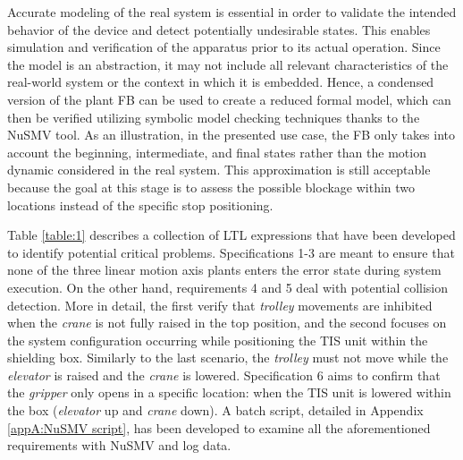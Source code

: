 \begin{bibunit}
Accurate modeling of the real system is essential in order to validate the  intended behavior of the device and detect potentially undesirable states. This enables simulation and verification of the apparatus prior to its actual operation. Since the model is an abstraction, it may not include all relevant characteristics of the real-world system or the context in which it is embedded. Hence, a condensed version of the plant FB can be used to create a reduced formal model, which can then be verified utilizing symbolic model checking techniques thanks to the NuSMV tool.
As an illustration, in the presented use case, the  FB only takes into account the beginning, intermediate, and final states rather than the motion dynamic considered in the real system. 
This approximation is still acceptable because the goal at this stage is to assess the possible blockage within two locations instead of the specific stop positioning. 

Table \ref{table:1} describes a collection of LTL expressions that have been developed to identify potential critical problems.
Specifications 1-3 are meant to ensure that none of the three linear motion axis plants enters the error state during system execution. On the other hand, requirements 4 and 5 deal with potential collision detection. More in detail, the first verify that \textit{trolley} movements are inhibited when the \textit{crane} is not fully raised in the top position, and the second focuses on the system configuration occurring while positioning the TIS unit within the shielding box. Similarly to the last scenario, the \textit{trolley} must not move while the \textit{elevator} is raised and the \textit{crane} is lowered.
Specification 6 aims to confirm that the \textit{gripper} only opens in a specific location: when the TIS unit is lowered within the box (\textit{elevator} up and \textit{crane} down). 
A batch script, detailed in Appendix \ref{appA:NuSMV script}, has been developed to examine all the aforementioned requirements with NuSMV and log data.


\end{bibunit}
